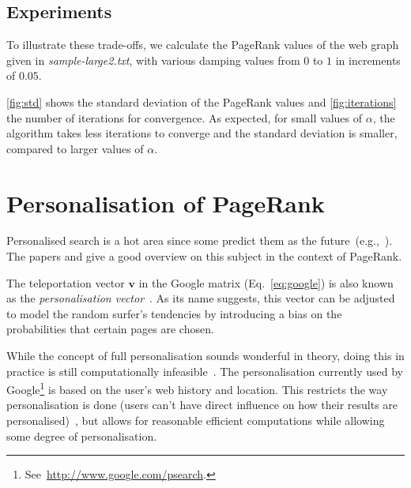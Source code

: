 \documentclass[a4paper,english,11pt]{scrartcl}
\renewcommand{\vec}[1]{\mathbf{#1}}
\begin{document}
\subsection{Experiments}
To illustrate these trade-offs, we calculate the PageRank values of the web graph given in \emph{sample-large2.txt}, with various damping values from $0$ to $1$ in increments of $0.05$. 

\autoref{fig:std} shows the standard deviation of the PageRank values and \autoref{fig:iterations} the number of iterations for convergence. 
As expected, for small values of $\alpha$, the algorithm takes less iterations to converge and the standard deviation is smaller, compared to larger values of $\alpha$.
% 

\section{Personalisation of PageRank}
\label{sec:personalisation}

Personalised search is a hot area since some predict them
as the future~(e.g.,~\cite{personalizations, Matthijs:2011:PWS:1935826.1935840,Stamou:2009:SPT:1499116.1499120,Wedig:2006:LAQ:1150402.1150497}). The papers \cite{personalizations} and \cite{deeper} give a good overview on this subject in the context of PageRank. 

The teleportation vector $\vec{v}$ in the Google matrix (Eq.~\ref{eq:google}) is also known as the \emph{personalisation vector}~\cite{math}. As its name suggests, this vector can be adjusted to model the random surfer's tendencies by introducing a bias on the probabilities that certain pages are chosen. 

While the concept of full personalisation sounds wonderful in theory, doing this in practice is still computationally infeasible~\cite{deeper}. The personalisation currently used by Google\footnote{See~\url{http://www.google.com/psearch}.} is based on the user's web history and location. This restricts the way personalisation is done (users can't have direct influence on how their results are personalised)~\cite{thesis}, but allows for reasonable efficient computations while allowing some degree of personalisation. 
\end{document}
